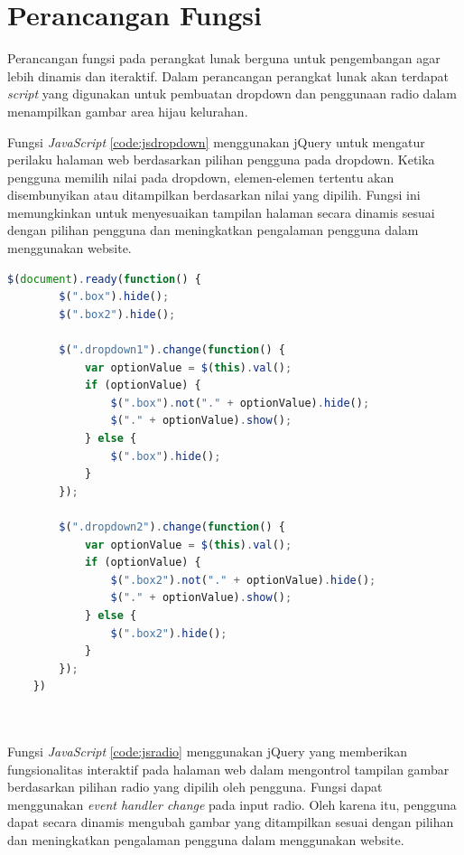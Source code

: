 \section{Perancangan Fungsi}
\label{sec:javascript}

Perancangan fungsi pada perangkat lunak berguna untuk pengembangan agar lebih dinamis dan iteraktif. Dalam perancangan perangkat lunak akan terdapat \textit{script} yang digunakan untuk pembuatan dropdown dan penggunaan radio dalam menampilkan gambar area hijau kelurahan. 

Fungsi \textit{JavaScript} \ref{code:jsdropdown} menggunakan jQuery untuk mengatur perilaku halaman web berdasarkan pilihan pengguna pada dropdown. Ketika pengguna memilih nilai pada dropdown, elemen-elemen tertentu akan disembunyikan atau ditampilkan berdasarkan nilai yang dipilih. Fungsi ini memungkinkan untuk menyesuaikan tampilan halaman secara dinamis sesuai dengan pilihan pengguna dan meningkatkan pengalaman pengguna dalam menggunakan website.

\begin{lstlisting}[language=JavaScript, caption=Fungsi Dropdown,label={code:jsdropdown}]
	$(document).ready(function() {
		$(".box").hide();
		$(".box2").hide();
		
		$(".dropdown1").change(function() {
			var optionValue = $(this).val();
			if (optionValue) {
				$(".box").not("." + optionValue).hide();
				$("." + optionValue).show();
			} else {
				$(".box").hide();
			}
		});
		
		$(".dropdown2").change(function() {
			var optionValue = $(this).val();
			if (optionValue) {
				$(".box2").not("." + optionValue).hide();
				$("." + optionValue).show();
			} else {
				$(".box2").hide();
			}
		});
	})

 
\end{lstlisting}

Fungsi \textit{JavaScript} \ref{code:jsradio} menggunakan jQuery yang memberikan fungsionalitas interaktif pada halaman web dalam mengontrol tampilan gambar berdasarkan pilihan radio yang dipilih oleh pengguna. Fungsi dapat menggunakan \textit{event handler change} pada input radio. Oleh karena itu, pengguna dapat secara dinamis mengubah gambar yang ditampilkan sesuai dengan pilihan dan meningkatkan pengalaman pengguna dalam menggunakan website.

